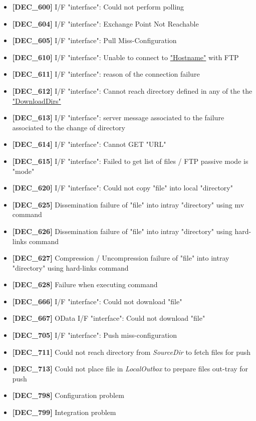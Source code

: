 \documentclass[dec_sum_main.tex]{subfiles}
\begin{document}
\begin{itemize}
	\item \textbf{[DEC\_600]} I/F "interface": Could not perform polling
	\item \textbf{[DEC\_604]} I/F "interface": Exchange Point Not Reachable
	\item \textbf{[DEC\_605]} I/F "interface": Pull Miss-Configuration
	\item \textbf{[DEC\_610]} I/F "interface": Unable to connect to \hyperref[Config_Server]{"Hostname"} with FTP
	\item \textbf{[DEC\_611]} I/F "interface": reason of the connection failure
	\item \textbf{[DEC\_612]} I/F "interface": Cannot reach directory defined in any of the the \hyperref[DownloadDirs]{"DownloadDirs"}
	\item \textbf{[DEC\_613]} I/F "interface": server message associated to the failure associated to the change of directory
	\item \textbf{[DEC\_614]} I/F "interface": Cannot GET "URL"
	\item \textbf{[DEC\_615]} I/F "interface": Failed to get list of files / FTP passive mode is "mode"
	\item \textbf{[DEC\_620]} I/F "interface": Could not copy "file" into local
"directory"
	\item \textbf{[DEC\_625]} Dissemination failure of "file" into intray
"directory" using mv command
	\item \textbf{[DEC\_626]} Dissemination failure of "file" into intray
"directory" using hard-links command
	\item \textbf{[DEC\_627]} Compression / Uncompression failure of "file" into intray
"directory" using hard-links command
	\item \textbf{[DEC\_628]} Failure when executing command
	\item \textbf{[DEC\_666]} I/F "interface": Could not download "file"
	\item \textbf{[DEC\_667]} OData I/F "interface": Could not download "file"
	\item \textbf{[DEC\_705]} I/F "interface": Push miss-configuration
	\item \textbf{[DEC\_711]} Could not reach directory from \textit{SourceDir} to fetch files for push
	\item \textbf{[DEC\_713]} Could not place file in  \textit{LocalOutbox} to prepare files out-tray for push
	\item \textbf{[DEC\_798]} Configuration problem	
	\item \textbf{[DEC\_799]} Integration problem
\end{itemize}
\end{document}
